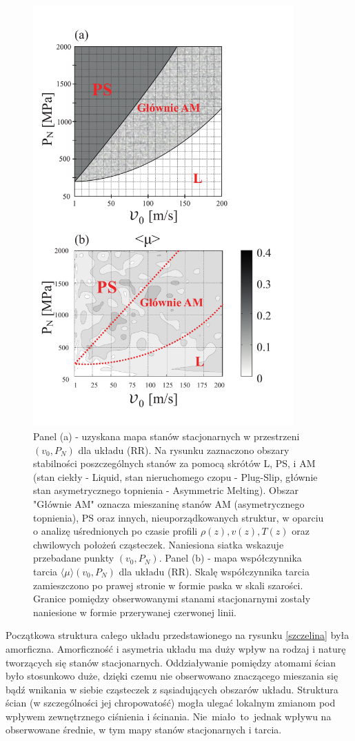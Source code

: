 \documentclass[12pt,a4paper,openright]{report} %
\begin{document}
\begin{figure}[h]
\centering
\includegraphics[width=100mm]{rysunki/stany_wsp_t.pdf}
\caption{Panel (a) - uzyskana mapa stanów stacjonarnych w przestrzeni $(v_0, P_N)$ dla układu (RR). Na rysunku zaznaczono obszary stabilności poszczególnych stanów za pomocą skrótów L, PS, i AM (stan ciekły - Liquid, stan nieruchomego czopu - Plug-Slip, głównie stan asymetrycznego topnienia - Asymmetric Melting). Obszar "Głównie AM" oznacza mieszaninę stanów AM (asymetrycznego topnienia), PS oraz innych, nieuporządkowanych struktur, w oparciu o analizę uśrednionych po czasie profili $\rho(z), v(z), T(z)$ oraz chwilowych położeń cząsteczek. Naniesiona siatka wskazuje przebadane punkty $(v_0, P_N)$. Panel (b) - mapa współczynnika tarcia $\langle \mu \rangle(v_0, P_N)$ dla układu (RR). Skalę współczynnika tarcia zamieszczono po prawej stronie w formie paska w skali szarości. Granice pomiędzy obserwowanymi stanami stacjonarnymi zostały naniesione w formie przerywanej czerwonej linii.}
\label{mapa_stanow_RR}
\end{figure}
\clearpage
Początkowa struktura całego układu  przedstawionego na rysunku \ref{szczelina} była amorficzna. Amorficzność i asymetria układu ma duży wpływ na rodzaj i naturę tworzących się stanów stacjonarnych. Oddziaływanie pomiędzy atomami ścian było stosunkowo duże, dzięki czemu nie obserwowano znaczącego mieszania się bądź wnikania w siebie cząsteczek z sąsiadujących obszarów układu. Struktura ścian (w szczególności jej chropowatość) mogła ulegać lokalnym zmianom pod wpływem zewnętrznego ciśnienia i ścinania. Nie~miało~to~jednak wpływu na obserwowane średnie, w tym mapy stanów stacjonarnych i tarcia.
\end{document}
